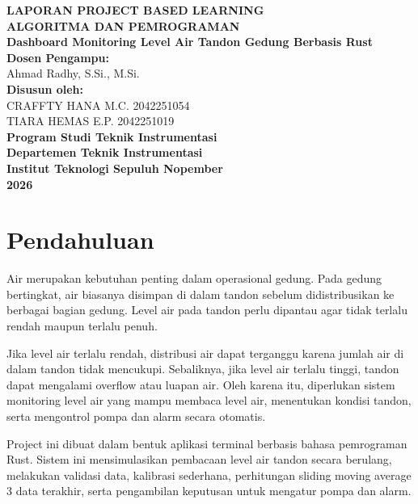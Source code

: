 \documentclass[12pt,a4paper]{article}
\begin{document}
\begin{titlepage}
    \centering
    {\Large \textbf{LAPORAN PROJECT BASED LEARNING}}\\[0.5cm]
    {\Large \textbf{ALGORITMA DAN PEMROGRAMAN}}\\[1cm]

    {\LARGE \textbf{Dashboard Monitoring Level Air Tandon Gedung Berbasis Rust}}\\[2cm]

    \textbf{Dosen Pengampu:}\\
    Ahmad Radhy, S.Si., M.Si.\\[1.5cm]

    \textbf{Disusun oleh:}\\[0.3cm]
    CRAFFTY HANA M.C. \hspace{0.5cm} 2042251054\\
    TIARA HEMAS E.P. \hspace{0.5cm} 2042251019\\[2cm]

    \textbf{Program Studi Teknik Instrumentasi}\\
    \textbf{Departemen Teknik Instrumentasi}\\
    \textbf{Institut Teknologi Sepuluh Nopember}\\[1cm]

    \textbf{2026}
\end{titlepage}

\tableofcontents
\newpage

\section{Pendahuluan}

Air merupakan kebutuhan penting dalam operasional gedung. Pada gedung bertingkat, air biasanya disimpan di dalam tandon sebelum didistribusikan ke berbagai bagian gedung. Level air pada tandon perlu dipantau agar tidak terlalu rendah maupun terlalu penuh.

Jika level air terlalu rendah, distribusi air dapat terganggu karena jumlah air di dalam tandon tidak mencukupi. Sebaliknya, jika level air terlalu tinggi, tandon dapat mengalami overflow atau luapan air. Oleh karena itu, diperlukan sistem monitoring level air yang mampu membaca level air, menentukan kondisi tandon, serta mengontrol pompa dan alarm secara otomatis.

Project ini dibuat dalam bentuk aplikasi terminal berbasis bahasa pemrograman Rust. Sistem ini mensimulasikan pembacaan level air tandon secara berulang, melakukan validasi data, kalibrasi sederhana, perhitungan sliding moving average 3 data terakhir, serta pengambilan keputusan untuk mengatur pompa dan alarm.
\end{document}
